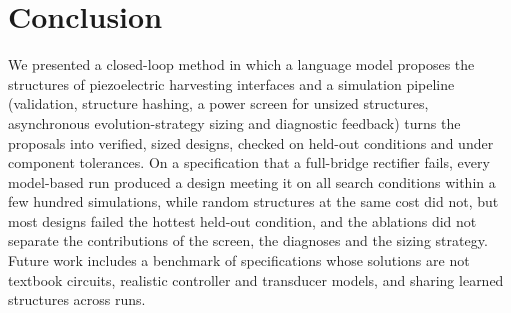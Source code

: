 \documentclass[journal]{IEEEtran}
\begin{document}
\section{Conclusion}
We presented a closed-loop method in which a language model proposes the structures of piezoelectric
harvesting interfaces and a simulation pipeline (validation, structure hashing, a power screen for
unsized structures, asynchronous evolution-strategy sizing and diagnostic feedback) turns the proposals
into verified, sized designs, checked on held-out conditions and under component tolerances.
On a specification that a full-bridge rectifier
fails, every model-based run produced a design meeting it on all search conditions within a few hundred
simulations, while random structures at the same cost did not, but most designs failed the hottest
held-out condition, and the ablations did not separate the contributions of the screen, the diagnoses and
the sizing strategy. Future work includes a benchmark of specifications whose
solutions are not textbook circuits, realistic controller and transducer models, and sharing learned
structures across runs.



\end{document}

